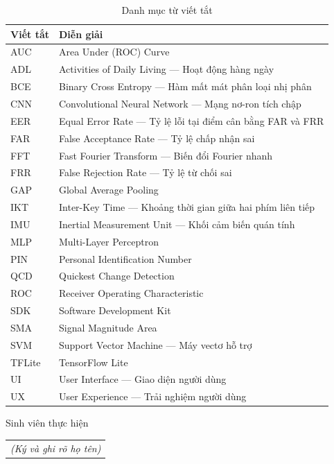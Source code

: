 \documentclass[../DoAn.tex]{subfiles}
\begin{document}
\begin{table}[H]
    \centering
    \caption{Danh mục từ viết tắt}
    \begin{tabular}{|l|p{11cm}|}
    \hline
    \textbf{Viết tắt} & \textbf{Diễn giải} \\ \hline
    
    AUC & Area Under (ROC) Curve \\ \hline
    ADL & Activities of Daily Living --- Hoạt động hàng ngày \\ \hline
    BCE & Binary Cross Entropy --- Hàm mất mát phân loại nhị phân \\ \hline
    CNN & Convolutional Neural Network --- Mạng nơ-ron tích chập \\ \hline
    EER & Equal Error Rate --- Tỷ lệ lỗi tại điểm cân bằng FAR và FRR \\ \hline
    FAR & False Acceptance Rate --- Tỷ lệ chấp nhận sai \\ \hline
    FFT & Fast Fourier Transform --- Biến đổi Fourier nhanh \\ \hline
    FRR & False Rejection Rate --- Tỷ lệ từ chối sai \\ \hline
    GAP & Global Average Pooling \\ \hline
    IKT & Inter-Key Time --- Khoảng thời gian giữa hai phím liên tiếp \\ \hline
    IMU & Inertial Measurement Unit --- Khối cảm biến quán tính \\ \hline
    MLP & Multi-Layer Perceptron \\ \hline
    PIN & Personal Identification Number \\ \hline
    QCD & Quickest Change Detection \\ \hline
    ROC & Receiver Operating Characteristic \\ \hline
    SDK & Software Development Kit \\ \hline
    SMA & Signal Magnitude Area \\ \hline
    SVM & Support Vector Machine --- Máy vectơ hỗ trợ \\ \hline
    TFLite & TensorFlow Lite \\ \hline
    UI & User Interface --- Giao diện người dùng \\ \hline
    UX & User Experience --- Trải nghiệm người dùng \\ \hline
    
    \end{tabular}
\end{table}

    \vspace{0.5cm}

    \begin{flushright}
        Sinh viên thực hiện\\
        \begin{tabular}{@{}c@{}}
            \textit{(Ký và ghi rõ họ tên)}
        \end{tabular}
    \end{flushright}
\end{document}
